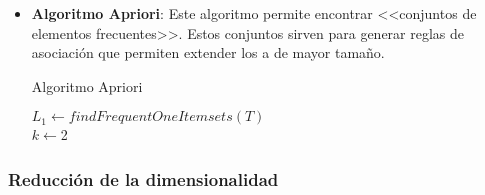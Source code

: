 \begin{itemize}
  \item \textbf{Algoritmo Apriori}: Este algoritmo permite encontrar <<conjuntos de elementos frecuentes>>. Estos conjuntos sirven para generar reglas de asociación que permiten extender los  a  de mayor tamaño.

        \begin{algorithm}[H]
          \caption{Algoritmo Apriori}

          \BlankLine
          \BlankLine

          $L_1 \gets findFrequentOneItemsets(T)$\\
          $k \gets $2\\

          \BlankLine

          \BlankLine

        \end{algorithm}

\end{itemize}

\subsubsection{Reducción de la dimensionalidad}

